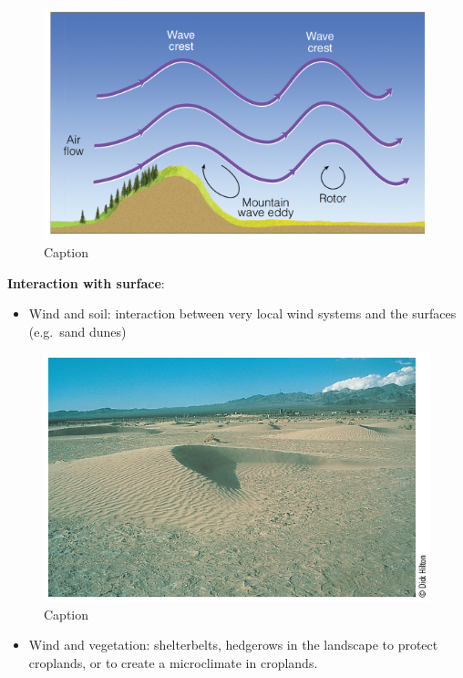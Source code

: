 \documentclass[12pt,oneside]{book}
\providecommand{\tightlist}{%
  \setlength{\itemsep}{0pt}\setlength{\parskip}{0pt}}
\begin{document}
\begin{figure}

{\centering \includegraphics[width=0.8\linewidth]{figures/Figure420} 

}

\caption{Caption}\label{fig:Eddies}
\end{figure}

\textbf{Interaction with surface}:

\begin{itemize}
\tightlist
\item
  Wind and soil: interaction between very local wind systems and the
  surfaces (e.g.~sand dunes)
\end{itemize}

\begin{figure}

{\centering \includegraphics[width=0.8\linewidth]{figures/Figure421} 

}

\caption{Caption}\label{fig:Soil}
\end{figure}

\begin{itemize}
\tightlist
\item
  Wind and vegetation: shelterbelts, hedgerows in the landscape to
  protect croplands, or to create a microclimate in croplands.
\end{itemize}
\end{document}
